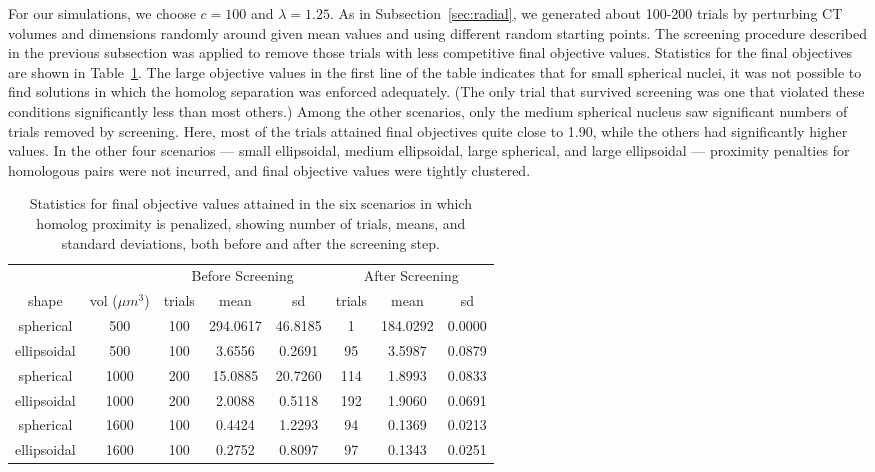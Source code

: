 \documentclass{siamltex}
\begin{document}
For our simulations, we choose $c = 100$ and $\lambda = 1.25$. As in
Subsection~\ref{sec:radial}, we generated about 100-200 trials by
perturbing CT volumes and dimensions randomly around given mean values
and using different random starting points. The screening procedure
described in the previous subsection was applied to remove those
trials with less competitive final objective values. Statistics for
the final objectives are shown in Table~\ref{ta:objectives:1.25}. The
large objective values in the first line of the table indicates that
for small spherical nuclei, it was not possible to find solutions in
which the homolog separation was enforced adequately. (The only trial
that survived screening was one that violated these conditions
significantly less than most others.) Among the other scenarios, only
the medium spherical nucleus saw significant numbers of trials removed
by screening. Here, most of the trials attained final objectives quite
close to 1.90, while the others had significantly higher values. In
the other four scenarios --- small ellipsoidal, medium ellipsoidal,
large spherical, and large ellipsoidal --- proximity penalties for
homologous pairs were not incurred, and final objective values were
tightly clustered.

\begin{table}[!b]
\centering
\caption{Statistics for final objective values attained in the six scenarios in which homolog proximity is penalized, showing number of trials, means, and standard deviations, both before and after the screening step.\label{ta:objectives:1.25}}
\begin{tabular}{cc|ccc|ccc}
&& \multicolumn{3}{c|}{Before Screening} &
\multicolumn{3}{c}{After Screening} \\ 
shape & vol ($\mu m^3$) & trials & mean & sd & trials 
& mean & sd \\ \hline
spherical &    500 &  100 & 294.0617 & 46.8185 &    1 & 184.0292 &  0.0000 \\
ellipsoidal &    500 &  100 &   3.6556 &  0.2691 &   95 &   3.5987 &  0.0879 \\
spherical &   1000 &  200 &  15.0885 & 20.7260 &  114 &   1.8993 &  0.0833 \\
ellipsoidal &   1000 &  200 &   2.0088 &  0.5118 &  192 &   1.9060 &  0.0691 \\
spherical &   1600 &  100 &   0.4424 &  1.2293 &   94 &   0.1369 &  0.0213 \\
ellipsoidal &   1600 &  100 &   0.2752 &  0.8097 &   97 &   0.1343 &  0.0251 
\end{tabular}
\end{table}
\end{document}
